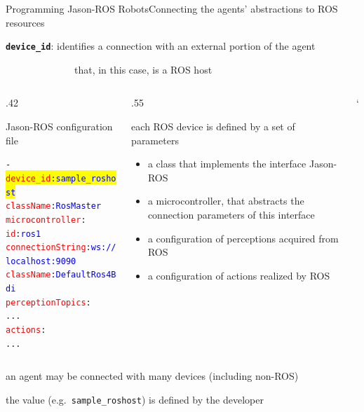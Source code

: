 \documentclass[compress]{beamer}
\newcommand{\yamlkey}[1]{\textcolor{red}{\texttt{#1}}}
\newcommand{\yamlvalue}[1]{\textcolor{blue}{\texttt{#1}}}
\begin{document}
\begin{frame}[fragile]{Programming Jason-ROS Robots}{Connecting the agents' abstractions to ROS resources}

    \footnotesize
    \texttt{{\bf device\_id}}: identifies a connection with an external portion of the agent\\ 
    
    \vspace{-.5cm}
    
    \ \ \ \ \ \ \ \ \ \ \ \ \ \ {\tiny that, in this case, is a ROS host}

    
    \begin{columns}
       \begin{column}{.42\textwidth}      
            \begin{block}{{\scriptsize Jason-ROS configuration file}}
                \scriptsize
                \begin{alltt} \tiny
- \colorbox{yellow}{\yamlkey{device\_id}: \yamlvalue{sample\_roshost}}
  \yamlkey{className}: \yamlvalue{RosMaster}
  \yamlkey{microcontroller}: 
    \yamlkey{id}: \yamlvalue{ros1} 
    \yamlkey{connectionString}: \yamlvalue{ws://localhost:9090} 
    \yamlkey{className}: \yamlvalue{DefaultRos4Bdi}
  \yamlkey{perceptionTopics}:         
    ...
  \yamlkey{actions}:       
    ...
                \end{alltt}

            \end{block}    
        \end{column}
        
        \hspace{-25pt} %
  
        \begin{column}{.55\textwidth} \scriptsize
  
            each ROS device is defined by a set of parameters
            \begin{itemize}\tiny
                \item a class that implements the interface Jason-ROS
                \item a microcontroller, that abstracts the connection parameters of this interface
                \item a configuration of perceptions acquired from ROS
                \item a configuration of actions realized by ROS
            \end{itemize}
        \end{column}`      
    \end{columns}
  
  
    \vspace{.3cm}
  
    an agent may be connected with many devices {\tiny (including non-ROS)}\\ \vspace{-.2cm}
  
    the value (e.g.~\texttt{sample\_roshost}) is defined by the developer
    
\end{frame}
\end{document}
